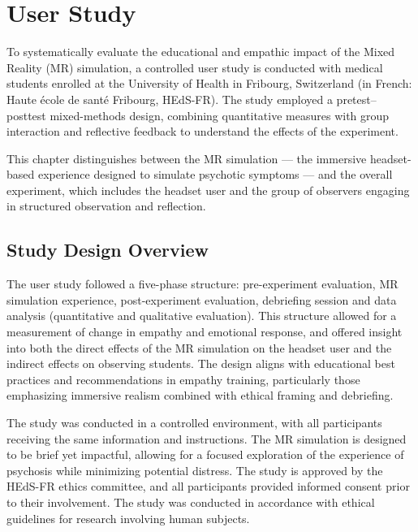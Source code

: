 \chapter{User Study}
\label{ch:userstudy}


To systematically evaluate the educational and empathic impact of the Mixed Reality (MR) simulation, a controlled user study is conducted with medical students enrolled at the University of Health in Fribourg, Switzerland (in French: Haute école de santé Fribourg, HEdS-FR). The study employed a pretest–posttest mixed-methods design, combining quantitative measures with group interaction and reflective feedback to understand the effects of the experiment.

\vspace{1em}

This chapter distinguishes between the MR simulation — the immersive headset-based experience designed to simulate psychotic symptoms — and the overall experiment, which includes the headset user and the group of observers engaging in structured observation and reflection.

\section{Study Design Overview}

The user study followed a five-phase structure: pre-experiment evaluation, MR simulation experience, post-experiment evaluation, debriefing session and data analysis (quantitative and qualitative evaluation). This structure allowed for a measurement of change in empathy and emotional response, and offered insight into both the direct effects of the MR simulation on the headset user and the indirect effects on observing students. The design aligns with educational best practices and recommendations in empathy training, particularly those emphasizing immersive realism combined with ethical framing and debriefing.


\vspace{1em}
The study was conducted in a controlled environment, with all participants receiving the same information and instructions. The MR simulation is designed to be brief yet impactful, allowing for a focused exploration of the experience of psychosis while minimizing potential distress.
The study is approved by the HEdS-FR ethics committee, and all participants provided informed consent prior to their involvement. The study was conducted in accordance with ethical guidelines for research involving human subjects.

